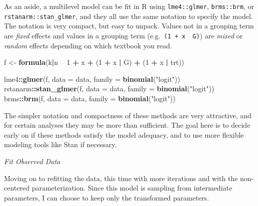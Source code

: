\documentclass[11pt, oneside, openany]{scrbook}
\newenvironment{Shaded}{\begin{snugshade}}{\end{snugshade}}
\newcommand{\DataTypeTok}[1]{\textcolor[rgb]{0.13,0.29,0.53}{#1}}
\newcommand{\DecValTok}[1]{\textcolor[rgb]{0.00,0.00,0.81}{#1}}
\newcommand{\KeywordTok}[1]{\textcolor[rgb]{0.13,0.29,0.53}{\textbf{#1}}}
\newcommand{\NormalTok}[1]{#1}
\newcommand{\OperatorTok}[1]{\textcolor[rgb]{0.81,0.36,0.00}{\textbf{#1}}}
\newcommand{\StringTok}[1]{\textcolor[rgb]{0.31,0.60,0.02}{#1}}
\begin{document}
As an aside, a multilevel model can be fit in R using \texttt{lme4::glmer}, \texttt{brms::brm}, or \texttt{rstanarm::stan\_glmer}, and they all use the same notation to specify the model. The notation is very compact, but easy to unpack. Values not in a grouping term are \emph{fixed} effects and values in a grouping term (e.g.~\texttt{(1\ +\ x\ \textbar{}\ G)}) are \emph{mixed} or \emph{random} effects depending on which textbook you read.


\begin{Shaded}
\begin{Highlighting}[]
\NormalTok{f <-}\StringTok{ }\KeywordTok{formula}\NormalTok{(k}\OperatorTok{|}\NormalTok{n }\OperatorTok{~}\StringTok{ }\DecValTok{1} \OperatorTok{+}\StringTok{ }\NormalTok{x }\OperatorTok{+}\StringTok{ }\NormalTok{(}\DecValTok{1} \OperatorTok{+}\StringTok{ }\NormalTok{x }\OperatorTok{|}\StringTok{ }\NormalTok{G) }\OperatorTok{+}\StringTok{ }\NormalTok{(}\DecValTok{1} \OperatorTok{+}\StringTok{ }\NormalTok{x }\OperatorTok{|}\StringTok{ }\NormalTok{trt))}

\NormalTok{lme4}\OperatorTok{::}\KeywordTok{glmer}\NormalTok{(f, }\DataTypeTok{data =}\NormalTok{ data, }\DataTypeTok{family =} \KeywordTok{binomial}\NormalTok{(}\StringTok{"logit"}\NormalTok{))}
\NormalTok{rstanarm}\OperatorTok{::}\KeywordTok{stan_glmer}\NormalTok{(f, }\DataTypeTok{data =}\NormalTok{ data, }\DataTypeTok{family =} \KeywordTok{binomial}\NormalTok{(}\StringTok{"logit"}\NormalTok{))}
\NormalTok{brms}\OperatorTok{::}\KeywordTok{brm}\NormalTok{(f, }\DataTypeTok{data =}\NormalTok{ data, }\DataTypeTok{family =} \KeywordTok{binomial}\NormalTok{(}\StringTok{"logit"}\NormalTok{))}
\end{Highlighting}
\end{Shaded}


The simpler notation and compactness of these methods are very attractive, and for certain analyses they may be more than sufficient. The goal here is to decide early on if these methods satisfy the model adequacy, and to use more flexible modeling tools like Stan if necessary.

\emph{Fit Observed Data}

Moving on to refitting the data, this time with more iterations and with the non-centered parameterization. Since this model is sampling from intermediate parameters, I can choose to keep only the transformed parameters.
\end{document}
